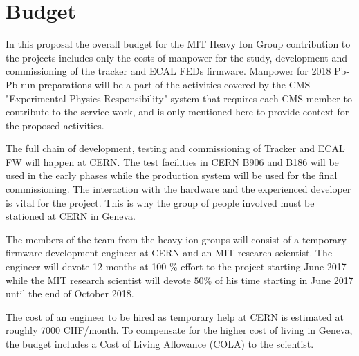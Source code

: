 \section{Budget}
\label{sec:funding}

In this proposal the overall budget for the MIT Heavy Ion Group contribution to the projects includes only the costs of manpower for the study, development and commissioning of the tracker and ECAL FEDs firmware. Manpower for 2018 Pb-Pb run preparations will be a part of the activities covered by the CMS "Experimental Physics Responsibility" system that requires each CMS member to contribute to the service work, and is only mentioned here to provide context for the proposed activities. 

The full chain of development, testing and commissioning of Tracker and ECAL FW will happen at CERN. The test facilities in CERN B906 and B186 will be used in the early phases while the production system will be used for the final commissioning. The interaction with the hardware and the experienced developer is vital for the project. This is why the group of people involved must be stationed at CERN in Geneva.

The members of the team from the heavy-ion groups will consist of a temporary firmware development engineer at CERN and an MIT research scientist. The engineer will devote 12 months at 100 \% effort to the project starting June 2017 while the MIT research scientist will devote $50\%$ of his time starting in June 2017 until the end of October 2018. 
 
The cost of an engineer to be hired as temporary help at CERN is estimated at roughly 7000 CHF/month. To compensate for the higher cost of living in Geneva, the budget includes a Cost of Living Allowance (COLA) to the scientist.  


